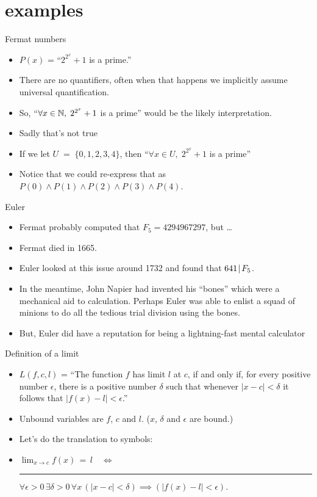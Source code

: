 \documentclass[landscape]{beamer}
\begin{document}
\section{examples}

\begin{frame}{Fermat numbers}
\begin{itemize}
\item $P(x)$ = ``$2^{2^x}+1$ is a prime.'' \pause
\item There are no quantifiers, often when that happens we implicitly assume universal quantification.\pause
\item So, ``$\forall x \in {\mathbb N}, \; 2^{2^x}+1$ is a prime'' would be the likely interpretation.\pause
\item Sadly that's not true \pause
\item If we let $U \; = \; \{0,1,2,3,4\}$, then ``$\forall x \in U, \; 2^{2^x}+1$ is a prime'' \pause
\item Notice that we could re-express that as $P(0) \land P(1) \land P(2) \land P(3) \land P(4)$.
\end{itemize}
\end{frame}

\begin{frame}{Euler}
\begin{itemize}
\item Fermat probably computed that $F_5=4294967297$, but \ldots \pause
\item Fermat died in 1665. \pause
\item Euler looked at this issue around 1732 and found that $641 \!\mid\! F_5$. \pause
\item In the meantime, John Napier had invented his ``bones'' which were a mechanical aid to calculation.  Perhaps Euler was able to enlist a squad of minions to do all the tedious trial division using the bones. \pause
\item But, Euler did have a reputation for being a lightning-fast mental calculator\textellipsis
\end{itemize}
\end{frame}

\begin{frame}{Definition of a limit}
\begin{itemize}
\item $L(f,c,l)$ = ``The function $f$ has limit $l$ at $c$, if 
and only if, 
for every positive number $\epsilon$, there is a positive number $\delta$ 
such that whenever $|x-c| < \delta$ it follows that $|f(x)-l| < \epsilon$.''  \pause
\item Unbound variables are $f$, $c$ and $l$. \pause ($x$, $\delta$ and $\epsilon$ are bound.)\pause
\item Let's do the translation to symbols:\pause
\item $ \lim_{x\rightarrow c} f(x) \, = \, l \quad \iff $ \newline
\rule{72pt}{0pt} $\forall \epsilon>0 \, \exists \delta>0 \, \forall x \, (|x-c| < \delta) \implies (|f(x)-l| < \epsilon). $
\end{itemize}
\end{frame}
\end{document}

